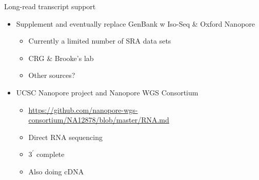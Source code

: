 \documentclass[10pt,
               hyperref={bookmarks=false,
                         bookmarksopen=false,
                         colorlinks=true,
                         linkcolor=blue,
                         urlcolor=blue},
               xcolor={svgnames,table}]{beamer}
\newenvironment{tightitemize}{%
\begin{itemize}
  \setlength{\itemsep}{1pt}%
  \setlength{\parskip}{0pt}%
  \setlength{\parsep}{0pt}%
}{\end{itemize}}
\begin{document}
\begin{frame}{Long-read transcript support}
  \begin{itemize}
  \item Supplement and eventually replace GenBank w Iso-Seq \& Oxford Nanopore
    \begin{tightitemize}
    \item Currently a limited number of SRA data sets
    \item CRG \& Brooke's lab
    \item Other sources? 
    \end{tightitemize}
  \item UCSC Nanopore project and Nanopore WGS Consortium
    \begin{tightitemize}
    \item \url{https://github.com/nanopore-wgs-consortium/NA12878/blob/master/RNA.md}
    \item Direct RNA sequencing
    \item $3^\prime$ complete
    \item Also doing cDNA
    \end{tightitemize}
  \end{itemize}
\end{frame}
\end{document}
